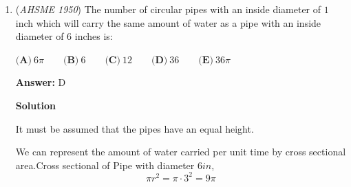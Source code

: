 \begin{enumerate}
 $\textbf{(A)}\ 9\text{ ft}\qquad\textbf{(B)}\ 15\text{ ft}\qquad\textbf{(C)}\ 5\text{ ft}\qquad\textbf{(D)}\ 8\text{ ft}\qquad\textbf{(E)}\ 4\text{ ft}$

 \textbf{Answer: }D



\textbf{Solution 1}

By the Pythag theorem, triple $(7,24,25)$, the point where the ladder meets the wall is $24$ feet above the ground. When the ladder slides, it becomes $20$ feet above the ground. By the $(15,20,25)$ Pythagorean triple, The foot of the ladder is now $15$ feet from the building. Thus, it slides $15-7 = \boxed{\textbf{(D)}\ 8\text{ ft}}$.

 



\textbf{Solution 2}

We can observe that the above setup forms a right angled triangles whose base is 7ft and whose hypotenuse is 25ft taking the height to be x ft.

 
 \[x^2 + 7^2 = 25^2\]
 \[x^2 = 625 - 49\]
 \[x^2 = 576\]
 \[x = 24\]

 Since the top of the ladder slipped by 4 ft the new height is $24 - 4 = 20 ft$. The base of the ladder has moved so the new base is say $(7+y)$. The hypotenuse remains the same at 25ft. So,

 
 \[20^2 + (7+y)^2 = 25^2\]
 \[400 + 49 + y^2 + 14y = 625\]
 \[y^2 + 14y - 176 = 0\]
 \[y^2 + 22y - 8y - 176\]
 \[x(y+22) - 8(y+22)\]
 \[(y-8)(y+22)\]

 Disregarding the negative solution to equation the solution to the problem is $\boxed{\textbf{(D)}\ 8\text{ ft}}$.

 


	\item (\textit{AHSME 1950}) The number of circular pipes with an inside diameter of $1$ inch which will carry the same amount of water as a pipe with an inside diameter of $6$ inches is:


 $\textbf{(A)}\ 6\pi\qquad\textbf{(B)}\ 6\qquad\textbf{(C)}\ 12\qquad\textbf{(D)}\ 36\qquad\textbf{(E)}\ 36\pi$

 \textbf{Answer: }D



\textbf{Solution}

It must be assumed that the pipes have an equal height.

 We can represent the amount of water carried per unit time by cross sectional area.Cross sectional of Pipe with diameter $6 in$, 
 \[\pi r^2 = \pi \cdot 3^2 = 9\pi\]


\end{enumerate}
